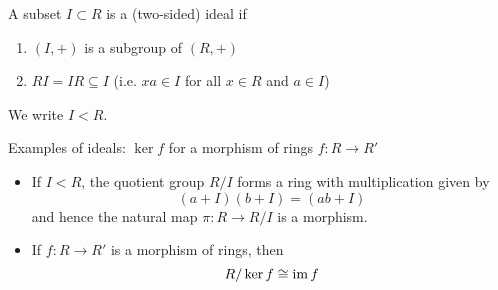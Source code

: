 \begin{defn}
	A subset $I \subset R$ is a (two-sided) ideal if
	\begin{enumerate}
		\item $(I,+)$ is a subgroup of $(R,+)$
		\item $RI = IR \subseteq I$ (i.e. $xa \in I$ for all $x \in R$ and $a \in I$)
	\end{enumerate}
	We write $I<R$.
\end{defn}

\begin{exam}
	Examples of ideals: $\ker f$ for a morphism of rings $f: R \to R'$
\end{exam}

\begin{exer}
	\begin{itemize}
		\item If $I<R$, the quotient group $R/I$ forms a ring with multiplication given by
		\[(a+I)(b+I)=(ab+I)\]
		and hence the natural map $\pi: R \to R/I$ is a morphism.
		\item If $f: R \to R'$ is a morphism of rings, then
		\[R/\ker f \cong \operatorname{im} f\]
	\end{itemize}
\end{exer}

